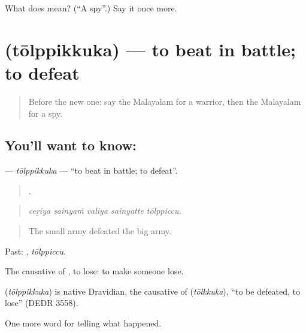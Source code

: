 \begin{tcolorbox}[breakable,colback=teal!4,colframe=teal!35!black,title={Before you move on}]
What does  mean? (\textquotedblleft{}A spy\textquotedblright{}.) Say it once more.
\end{tcolorbox}
\section[\texorpdfstring{\ml{തോൽപ്പിക്കുക} (tōlppikkuka)}{തോൽപ്പിക്കുക (tōlppikkuka)}]{ (tōlppikkuka) — to beat in battle; to defeat}

\label{lesson:ML-C400-tolppikkuka}



\begin{quote}
Before the new one: say the Malayalam for a warrior, then the Malayalam for a spy.
\end{quote}

\subsection*{You'll want to know: }
\textbf{} — \emph{tōlppikkuka} — \textquotedblleft{}to beat in battle; to defeat\textquotedblright{}.

\begin{quote}
    .
\end{quote}

\begin{quote}
\emph{ceṟiya sainyaṁ valiya sainyatte tōlppiccu.}
\end{quote}

\begin{quote}
The small army defeated the big army.
\end{quote}

Past: , \emph{tōlppiccu}.

The causative of , to lose: to make someone lose.

\begin{cousinweb}
\textbf{} (\emph{tōlppikkuka}) is native Dravidian, the causative of  (\emph{tōlkkuka}), \textquotedblleft{}to be defeated, to lose\textquotedblright{} (DEDR 3558).
\end{cousinweb}

\begin{grammarlens}[title={What you've built}]
One more word for telling what happened.
\end{grammarlens}

